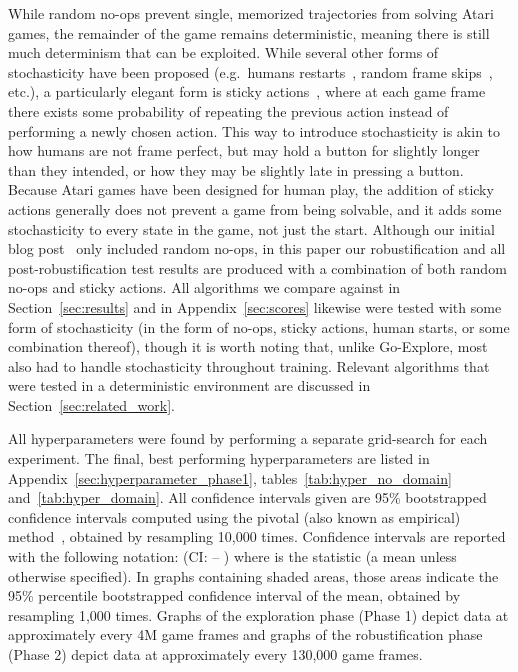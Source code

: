 \documentclass{article}
\newcommand{\pivotci}[2]{(CI: #1 -- #2)}  \newcommand{\percci}[2]{}  \newcommand{\tpivotci}[2]{(#1 -- #2)}  \newcommand{\tpercci}[2]{}  \newcommand{\na}[0]{-}
\begin{document}
While random no-ops prevent single, memorized trajectories from solving Atari games, the remainder of the game remains deterministic, meaning there is still much determinism that can be exploited. While several other forms of stochasticity have been proposed (e.g.\ humans restarts~\cite{nair2015massively}, random frame skips~\cite{brockman}, etc.), a particularly elegant form is sticky actions~\cite{Machado2018RevisitingTA}, where at each game frame there exists some probability of repeating the previous action instead of performing a newly chosen action. This way to introduce stochasticity is akin to how humans are not frame perfect, but may hold a button for slightly longer than they intended, or how they may be slightly late in pressing a button. Because Atari games have been designed for human play, the addition of sticky actions generally does not prevent a game from being solvable, and it adds some stochasticity to every state in the game, not just the start. Although our initial blog post~\cite{ecoffet:bloggoexplore2018} only included random no-ops, in this paper our robustification and all post-robustification test results are produced with a combination of both random no-ops and sticky actions. All algorithms we compare against in Section~\ref{sec:results} and in Appendix~\ref{sec:scores} likewise were tested with some form of stochasticity (in the form of no-ops, sticky actions, human starts, or some combination thereof), though it is worth noting that, unlike Go-Explore, most also had to handle stochasticity throughout training. Relevant algorithms that were tested in a deterministic environment are discussed in Section~\ref{sec:related_work}.

All hyperparameters were found by performing a separate grid-search for each experiment. The final, best performing hyperparameters are listed in Appendix~\ref{sec:hyperparameter_phase1}, tables~\ref{tab:hyper_no_domain} and~\ref{tab:hyper_domain}.
All confidence intervals given are 95\% bootstrapped confidence intervals computed using the pivotal (also known as empirical) method~\cite{Zoubir2007BootstrapMA}, obtained by resampling 10,000 times. Confidence intervals are reported with the following notation:  \pivotci{}{}\percci{}{} where  is the statistic (a mean unless otherwise specified). In graphs containing shaded areas, those areas indicate the 95\% percentile bootstrapped confidence interval of the mean, obtained by resampling 1,000 times. 
Graphs of the exploration phase (Phase 1) depict data at approximately every 4M game frames and graphs of the robustification phase (Phase 2) depict data at approximately every 130,000 game frames.
\end{document}
